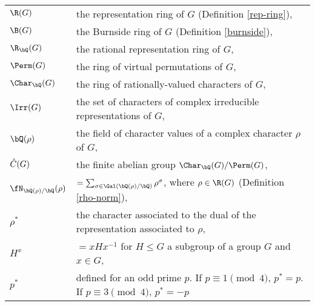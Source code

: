 \begin{tabular}{l | l}
     $\R(G)$ & the representation ring of $G$ (Definition \ref{rep-ring}), \\
     $\B(G)$ & the Burnside ring of $G$ (Definition \ref{burnside}), \\
    $\R_{\bQ}(G)$ & the rational representation ring of $G$, \\
    $\Perm(G)$ & the ring of virtual permutations of $G$, \\
    $\Char_{\bQ}(G)$ & the ring of rationally-valued characters of $G$,\\
    $\Irr(G)$ & the set of characters of complex irreducible representations of $G$, \\
    $\bQ(\rho)$ & the field of character values of a complex character $\rho$ of $G$, \\
    $\hat{C}(G)$ & the finite abelian group $\Char_{\bQ}(G) / \Perm(G)$, \\ 
    $\repnorm{\rho}$ &  $ = \sum_{\sigma \in \Gal(\bQ(\rho) / \bQ)} \rho^{\sigma}$, where $\rho \in \R(G)$ (Definition \ref{rho-norm}),\\
    $\rho^*$ & the character associated to the dual of the representation associated to $\rho$,
    \\
    $H^{x}$ & $= xHx^{-1}$  for $H \leq G$ a subgroup of a group $G$ and $x \in G$,\\
    $p^*$ & defined for an odd prime $p$. If $p \equiv 1 \pmod 4$, $p^* = p$. If $p \equiv 3 \pmod 4$, $p^* = -p$
\end{tabular}
\vspace{2em}


